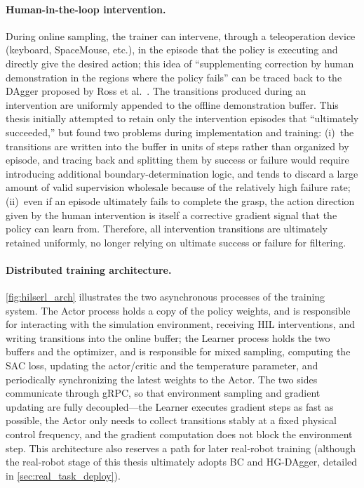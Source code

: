 \paragraph{Human-in-the-loop intervention.} During online sampling, the trainer can intervene, through a teleoperation device (keyboard, SpaceMouse, etc.), in the episode that the policy is executing and directly give the desired action; this idea of ``supplementing correction by human demonstration in the regions where the policy fails'' can be traced back to the DAgger proposed by Ross et al.~\cite{ross2011dagger}. The transitions produced during an intervention are uniformly appended to the offline demonstration buffer. This thesis initially attempted to retain only the intervention episodes that ``ultimately succeeded,'' but found two problems during implementation and training: (i)~the transitions are written into the buffer in units of steps rather than organized by episode, and tracing back and splitting them by success or failure would require introducing additional boundary-determination logic, and tends to discard a large amount of valid supervision wholesale because of the relatively high failure rate; (ii)~even if an episode ultimately fails to complete the grasp, the action direction given by the human intervention is itself a corrective gradient signal that the policy can learn from. Therefore, all intervention transitions are ultimately retained uniformly, no longer relying on ultimate success or failure for filtering.

\paragraph{Distributed training architecture.} \cref{fig:hilserl_arch} illustrates the two asynchronous processes of the training system. The Actor process holds a copy of the policy weights, and is responsible for interacting with the simulation environment, receiving HIL interventions, and writing transitions into the online buffer; the Learner process holds the two buffers and the optimizer, and is responsible for mixed sampling, computing the SAC loss, updating the actor/critic and the temperature parameter, and periodically synchronizing the latest weights to the Actor. The two sides communicate through gRPC, so that environment sampling and gradient updating are fully decoupled---the Learner executes gradient steps as fast as possible, the Actor only needs to collect transitions stably at a fixed physical control frequency, and the gradient computation does not block the environment step. This architecture also reserves a path for later real-robot training (although the real-robot stage of this thesis ultimately adopts BC and HG-DAgger, detailed in \cref{sec:real_task_deploy}).

